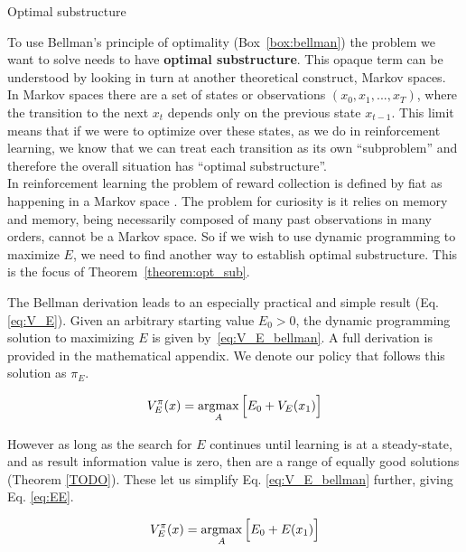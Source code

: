 \begin{featurebox}
	\caption{Optimal substructure}
	\label{box:substructure}
	To use Bellman's principle of optimality (Box~\ref{box:bellman}) the problem we want to solve needs to have \textbf{optimal substructure}. This opaque term can be understood by looking in turn at another theoretical construct, Markov spaces. 
	\\
	In Markov spaces there are a set of states or observations $(x_0, x_1, ..., x_{T})$, where the transition to the next $x_t$ depends only on the previous state $x_{t-1}$. This limit means that if we were to optimize over these states, as we do in reinforcement learning, we know that we can treat each transition as its own ``subproblem'' and therefore the overall situation has ``optimal substructure''.
	\\
	In reinforcement learning the problem of reward collection is defined by fiat as happening in a Markov space \cite{Sutton2018}. The problem for curiosity is it relies on memory and memory, being necessarily composed of many past observations in many orders, cannot be a Markov space. So if we wish to use dynamic programming to maximize $E$, we need to find another way to establish optimal substructure. This is the focus of Theorem~\ref{theorem:opt_sub}.
	\medskip
\end{featurebox}

The Bellman derivation leads to an especially practical and simple result (Eq. \ref{eq:V_E}). Given an arbitrary starting value $E_0 > 0$, the dynamic programming solution to maximizing $E$ is given by~\ref{eq:V_E_bellman}. A full derivation is provided in the mathematical appendix. We denote our policy that follows this solution as $\pi_E$.

\begin{equation}
	\label{eq:V_E_bellman} 
	V^{\pi}_E(x) = \operatorname*{argmax}_A \Big [ E_0 + V_E(x_1) \Big ]
\end{equation}


However as long as the search for $E$ continues until learning is at a steady-state, and as result information value is zero, then are a range of equally good solutions (Theorem \ref{TODO}). These let us simplify Eq. \ref{eq:V_E_bellman} further, giving Eq. \ref{eq:EE}. 

\begin{equation}
	\label{eq:EE} 
	V^{\pi}_E(x) = \operatorname*{argmax}_A \Big [ E_0 + E(x_1) \Big ]
\end{equation}

